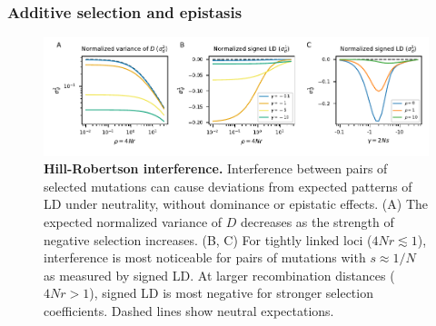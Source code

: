 \documentclass[]{article}
\begin{document}
\subsubsection{Additive selection and epistasis}
\label{sec:additive-selection}

\begin{figure}[tb!]
    \centering
    \includegraphics{../figures/hill_robertson}
    \caption{
        \textbf{Hill-Robertson interference.}
        Interference between pairs of selected mutations can cause deviations
        from expected patterns of LD under neutrality, without dominance
        or epistatic effects.
        (A) The expected normalized variance of $D$ decreases as the strength
        of negative selection increases.
        (B, C) For tightly linked loci (\(4Nr \lesssim 1\)), interference is most
        noticeable for pairs of mutations with \(s \approx 1/N\) as measured by
        signed LD.
        At larger recombination distances (\(4Nr > 1\)), signed LD is most
        negative for stronger selection coefficients. Dashed lines
        show neutral expectations.
    }
    \label{fig:HillRobertson}
\end{figure}
\end{document}

